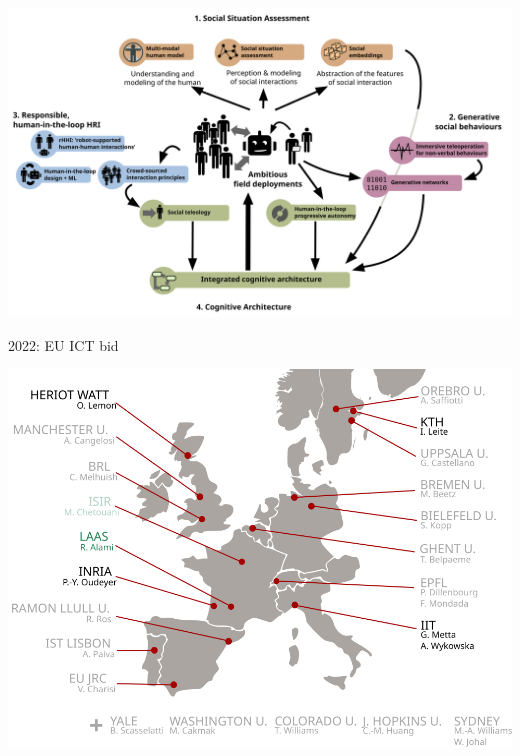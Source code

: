 \documentclass[xcolor=table]{beamer}
\begin{document}
\begin{frame}
\begin{center}
{        \includegraphics[trim=8cm 0 8cm 16cm,clip,width=\linewidth]{architectures/wps}
    }
    \end{center}
\end{frame}

\begin{frame}{2022: EU ICT bid}
    \begin{center}
        \includegraphics[width=0.8\linewidth]{collaborations_map_project}
    \end{center}
\end{frame}
\end{document}
